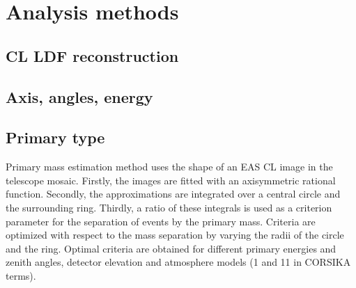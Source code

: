 \documentclass[a4paper,11pt]{article}
\begin{document}
\section{Analysis methods}
\subsection{CL LDF reconstruction}

\subsection{Axis, angles, energy}
\subsection{Primary type}
Primary mass estimation method uses the shape of an EAS CL image in the telescope mosaic. Firstly, the images are fitted with an axisymmetric rational function. Secondly, the approximations are integrated over a central circle and the surrounding ring. Thirdly, a ratio of these integrals is used as a criterion parameter for the separation of events by the primary mass. Criteria are optimized with respect to the mass separation by varying the radii of the circle and the ring. Optimal criteria are obtained for different primary energies and zenith angles, detector elevation and atmosphere models (1 and 11 in CORSIKA terms).
\end{document}
